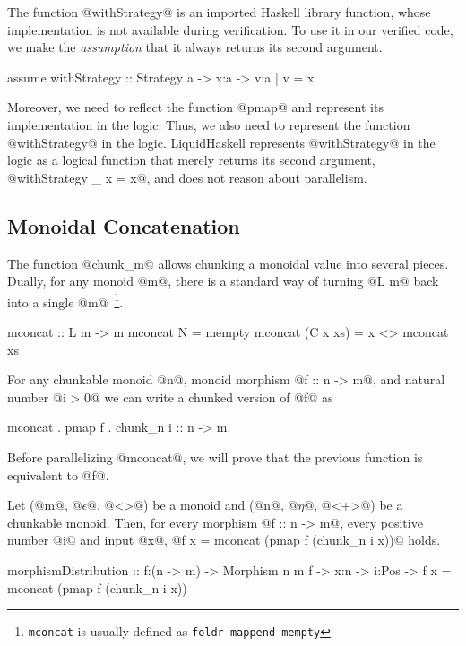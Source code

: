The function @withStrategy@ is an imported Haskell library function,
whose implementation is not available during verification.
%
To use it in our verified code, we make the \textit{assumption}
that it always returns its second argument.
\begin{code}
  assume withStrategy :: Strategy a -> x:a -> {v:a | v = x}
\end{code}
%
Moreover, we need to reflect the function @pmap@ and represent its
implementation in the logic.
%
Thus, we also need to represent the function @withStrategy@ in the logic.
%
LiquidHaskell represents @withStrategy@ in the logic as a logical
function that merely returns
its second argument, @withStrategy _ x = x@,
and does not reason about parallelism.


\subsection{Monoidal Concatenation}\label{subsec:mconcat}
The function @chunk_m@ allows chunking a monoidal value into several
pieces. Dually, for any monoid @m@, there is a
standard way of turning @L m@ back into a single @m@~\footnote{\texttt{mconcat} is usually defined as \texttt{foldr mappend mempty}}.
\begin{code}
  mconcat :: L m -> m
  mconcat N        = mempty
  mconcat (C x xs) = x <> mconcat xs
\end{code}
%
For any chunkable monoid @n@,
%
monoid morphism @f :: n -> m@,
%
and natural number @i > 0@
%
we can write a chunked version of @f@ as
\begin{code}
  mconcat . pmap f . chunk_n i :: n -> m.
\end{code}
Before parallelizing @mconcat@, we will prove that the previous function is equivalent to @f@.

\begin{theorem}\label{theorem:monoid:distribution}
Let (@m@, @$\epsilon$@, @<>@) be a monoid
and (@n@, @$\eta$@, @<+>@) be a chunkable monoid.
%
Then, for every morphism @f :: n -> m@,
every positive number @i@ and input @x@,
@f x = mconcat (pmap f (chunk_n i x))@ holds.
%
\begin{code}
  morphismDistribution
    :: f:(n -> m) -> Morphism n m f -> x:n -> i:Pos
    -> {f x = mconcat (pmap f (chunk_n i x))}
\end{code}
\end{theorem}

